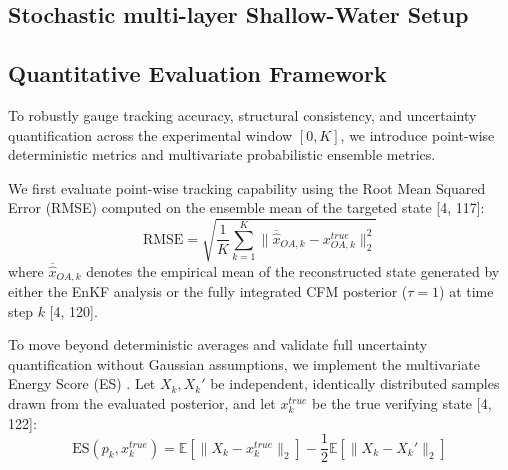 \documentclass[10pt]{article}
\begin{document}
\subsection{Stochastic multi-layer Shallow-Water Setup}



\subsection{Quantitative Evaluation Framework}
To robustly gauge tracking accuracy, structural consistency, and uncertainty quantification across the experimental window $[0, K]$, we introduce point-wise deterministic metrics and multivariate probabilistic ensemble metrics.

We first evaluate point-wise tracking capability using the Root Mean Squared Error (RMSE) computed on the ensemble mean of the targeted state [4, 117]:
\begin{equation}
    \text{RMSE} = \sqrt{\frac{1}{K}\sum_{k=1}^{K}\|\overline{\hat{x}}_{OA,k}-x_{OA,k}^{true}\|_{2}^{2}}
\end{equation}
where $\overline{\hat{x}}_{OA,k}$ denotes the empirical mean of the reconstructed state generated by either the EnKF analysis or the fully integrated CFM posterior ($\tau=1$) at time step $k$ [4, 120]. 

To move beyond deterministic averages and validate full uncertainty quantification without Gaussian assumptions, we implement the multivariate Energy Score (ES) \cite{gneiting_2017,gneiting_2018}. Let $X_{k}, X_{k}'$ be independent, identically distributed samples drawn from the evaluated posterior, and let $x_{k}^{true}$ be the true verifying state [4, 122]:
\begin{equation}
    \text{ES}(p_{k},x_{k}^{true}) = \mathbb{E}[\|X_{k}-x_{k}^{true}\|_{2}] - \frac{1}{2}\mathbb{E}[\|X_{k}-X_{k}'\|_{2}]
\end{equation}

\end{document}
